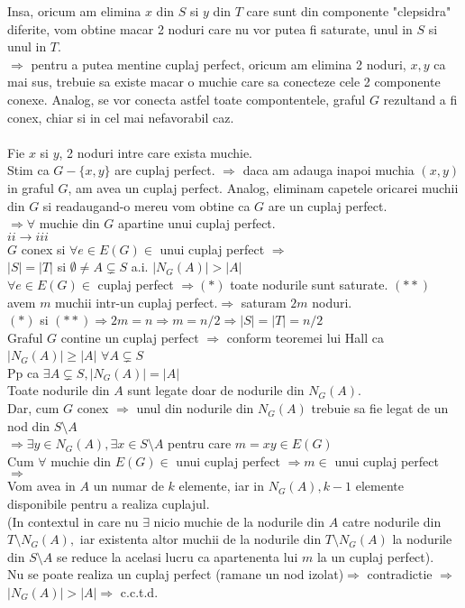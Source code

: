 \documentclass{article}
\begin{document}
Insa, oricum am elimina $x$ din $S$ si $y$ din $T$ care sunt din componente "clepsidra" diferite, vom obtine macar 2 noduri care nu vor putea fi saturate, unul in $S$ si unul in $T$.\\
$\Rightarrow$ pentru a putea mentine cuplaj perfect, oricum am elimina 2 noduri, $x,y$ ca mai sus, trebuie sa existe macar o muchie care sa conecteze cele 2 componente conexe. Analog, se vor conecta astfel toate compontentele, graful $G$ rezultand a fi conex, chiar si in cel mai nefavorabil caz.\\
\bigskip\\
Fie $x$ si $y$, 2 noduri intre care exista muchie.\\
Stim ca $G-\{x,y\}$ are cuplaj perfect. $\Rightarrow$ daca am adauga inapoi muchia $(x,y)$ in graful $G$, am avea un cuplaj perfect. Analog, eliminam capetele oricarei muchii din $G$ si readaugand-o mereu vom obtine ca $G$ are un cuplaj perfect.\\
$\Rightarrow \forall$ muchie din $G$ apartine unui cuplaj perfect.\\
 

$ii \rightarrow iii$\\
$G$ conex si $\forall e\in E(G) \in $ unui cuplaj perfect $\Rightarrow$\\
$|S|=|T|$ si $\emptyset \neq A  \subsetneq S$ a.i. $|N_G(A)|>|A|$\\
$\forall e \in E(G) \in$ cuplaj perfect $\Rightarrow (*)$ toate nodurile sunt saturate. $(**)$ avem $m$ muchii intr-un cuplaj perfect.$\Rightarrow $ saturam $2m$ noduri.\\
$(*) $ si $(**) \Rightarrow 2m=n \Rightarrow m=n/2 \Rightarrow |S|=|T|=n/2$\\
Graful $G$ contine un cuplaj perfect $\Rightarrow$ conform teoremei lui Hall ca $|N_G(A)| \geq |A|$
$\forall A \subsetneq S$\\
Pp ca $\exists  A \subsetneq S, |N_G(A)|=|A| $\\
Toate nodurile din $A$ sunt legate doar de nodurile din $N_G(A)$.\\
Dar, cum $G$ conex $\Rightarrow$ unul din nodurile din $N_G(A)$ trebuie sa fie legat de un nod din $S\setminus A$\\
$\Rightarrow \exists y \in N_G(A), \exists x\in S \setminus A$ pentru care $m=xy \in E(G)$\\
Cum $\forall$ muchie din $E(G)\in$ unui cuplaj perfect $\Rightarrow m\in$ unui cuplaj perfect $\Rightarrow$\\
Vom avea in $A$ un numar de $k$ elemente, iar in $N_G(A), k-1$ elemente disponibile pentru a realiza cuplajul.\\
(In contextul in care nu $\exists$ nicio muchie de la nodurile din $A$ catre nodurile din $T\setminus  N_G(A),$ iar existenta altor muchii de la nodurile din $T\setminus N_G(A)$ la nodurile din $S\setminus A$ se reduce la acelasi lucru ca apartenenta lui $m$ la un cuplaj perfect).\\
Nu se poate realiza un cuplaj perfect (ramane un nod izolat)$\Rightarrow $ contradictie $\Rightarrow$\\
$|N_G(A)|>|A| \Rightarrow$ c.c.t.d.\\
\bigskip\\
\end{document}
